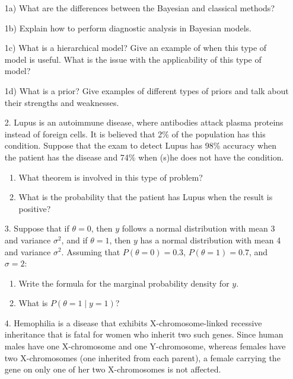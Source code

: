 \documentclass[12pt,a4paper,twoside]{article}
\begin{document}
\begin{enumerate}
    \item[1a)] What are the differences between the Bayesian and classical methods?
    \item[1b)] Explain how to perform diagnostic analysis in Bayesian models.
    \item[1c)] What is a hierarchical model? Give an example of when this type of model is useful. What is the
    issue with the applicability of this type of model?
    \item[1d)] What is a prior? Give examples of different types of priors and talk about their strengths and
    weaknesses.
    \item[2.] Lupus is an autoimmune disease, where antibodies attack plasma proteins instead of foreign cells.
    It is believed that 2\% of the population has this condition. Suppose that the exam to detect Lupus has 98\%
    accuracy when the patient has the disease and 74\% when (s)he does not have the condition.
    \begin{enumerate}[label=\textbf{2\alph*)}]
        \item What theorem is involved in this type of problem?
        \item What is the probability that the patient has Lupus when the result is positive?
    \end{enumerate}
    \item[3.] Suppose that if $\theta = 0$, then $y$ follows a normal distribution with mean 3 and variance $\sigma^2$,
    and if $\theta = 1$, then $y$ has a normal distribution with mean 4 and variance $\sigma^2$. Assuming that
    $P(\theta = 0) = 0.3$, $P(\theta = 1) = 0.7$, and $\sigma = 2$:
    \begin{enumerate}[label=\textbf{3\alph*)}]
        \item Write the formula for the marginal probability density for $y$.
        \item What is $P(\theta = 1 \mid y = 1)$?
    \end{enumerate}
    \item[4.] Hemophilia is a disease that exhibits X-chromosome-linked recessive inheritance that is fatal for women who
    inherit two such genes. Since human males have one X-chromosome and one Y-chromosome, whereas females have two X-chromosomes
    (one inherited from each parent), a female carrying the gene on only one of her two X-chromosomes is not affected.
    

\end{enumerate}
\end{document}
